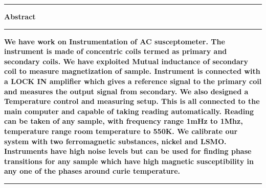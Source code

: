 

\onecolumn
\begin{table*}[hbt!]\centering
  \vskip50pt
  \parbox[h]{.75\textwidth}{\centering \hrule height 2pt \vskip10pt\Large \textbf{Abstract} \vskip10pt \hrule height 2pt \vskip10pt}
  \parbox[h]{.75\textwidth}{\normalsize \textbf{
       We have work on Instrumentation of AC susceptometer. The instrument is made of concentric coils termed as primary and secondary coils. We have exploited Mutual inductance of secondary coil to measure magnetization of sample. Instrument is connected with a LOCK IN amplifier which gives a reference signal to the primary coil and measures the output signal from secondary. We also designed a Temperature control and measuring setup. This is all connected to the main computer and capable of taking reading automatically. Reading can be taken of any sample, with frequency range 1mHz to 1Mhz, temperature range room temperature to 550K. We calibrate our system with two ferromagnetic substances, nickel and LSMO. Instruments have high noise levels but can be used for finding phase transitions for any sample which have high magnetic susceptibility in any one of the phases around curie temperature.
} \vskip10pt \hrule height 2pt \vskip10pt}
\end{table*}
\clearpage
\begin{table*}[hbt!]\centering
\vskip20pt
\parbox[h]{.75\textwidth}{\tableofcontents}
\end{table*}
\clearpage
\twocolumn
